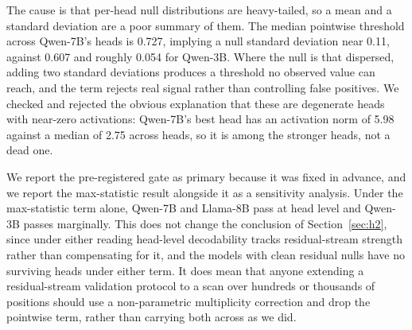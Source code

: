 The cause is that per-head null distributions are heavy-tailed, so a mean and a standard
deviation are a poor summary of them. The median pointwise threshold across Qwen-7B's heads
is 0.727, implying a null standard deviation near 0.11, against 0.607 and roughly 0.054 for
Qwen-3B. Where the null is that dispersed, adding two standard deviations produces a
threshold no observed value can reach, and the term rejects real signal rather than
controlling false positives. We checked and rejected the obvious explanation that these are
degenerate heads with near-zero activations: Qwen-7B's best head has an activation norm of
5.98 against a median of 2.75 across heads, so it is among the stronger heads, not a dead
one.
 
We report the pre-registered gate as primary because it was fixed in advance, and we report
the max-statistic result alongside it as a sensitivity analysis. Under the max-statistic
term alone, Qwen-7B and Llama-8B pass at head level and Qwen-3B passes marginally. This does
not change the conclusion of Section~\ref{sec:h2}, since under either reading head-level
decodability tracks residual-stream strength rather than compensating for it, and the models
with clean residual nulls have no surviving heads under either term. It does mean that
anyone extending a residual-stream validation protocol to a scan over hundreds or thousands
of positions should use a non-parametric multiplicity correction and drop the pointwise term,
rather than carrying both across as we did.